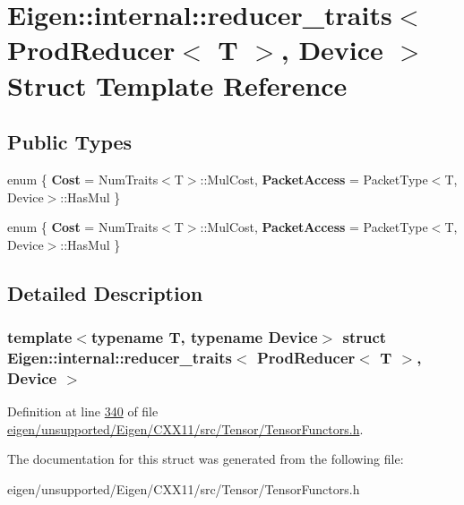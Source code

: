 \hypertarget{struct_eigen_1_1internal_1_1reducer__traits_3_01_prod_reducer_3_01_t_01_4_00_01_device_01_4}{}\section{Eigen\+:\+:internal\+:\+:reducer\+\_\+traits$<$ Prod\+Reducer$<$ T $>$, Device $>$ Struct Template Reference}
\label{struct_eigen_1_1internal_1_1reducer__traits_3_01_prod_reducer_3_01_t_01_4_00_01_device_01_4}
\subsection*{Public Types}
\begin{DoxyCompactItemize}
\item 
\mbox{\label{struct_eigen_1_1internal_1_1reducer__traits_3_01_prod_reducer_3_01_t_01_4_00_01_device_01_4_aee5e447fa255c076d8ab162254d69d8b}} 
enum \{ {\bfseries Cost} = Num\+Traits$<$T$>$\+:\+:Mul\+Cost, 
{\bfseries Packet\+Access} = Packet\+Type$<$T, Device$>$\+:\+:Has\+Mul
 \}
\item 
\mbox{\label{struct_eigen_1_1internal_1_1reducer__traits_3_01_prod_reducer_3_01_t_01_4_00_01_device_01_4_a773fd34dac3730ab17124f770431b870}} 
enum \{ {\bfseries Cost} = Num\+Traits$<$T$>$\+:\+:Mul\+Cost, 
{\bfseries Packet\+Access} = Packet\+Type$<$T, Device$>$\+:\+:Has\+Mul
 \}
\end{DoxyCompactItemize}


\subsection{Detailed Description}
\subsubsection*{template$<$typename T, typename Device$>$\newline
struct Eigen\+::internal\+::reducer\+\_\+traits$<$ Prod\+Reducer$<$ T $>$, Device $>$}



Definition at line \hyperlink{eigen_2unsupported_2_eigen_2_c_x_x11_2src_2_tensor_2_tensor_functors_8h_source_l00340}{340} of file \hyperlink{eigen_2unsupported_2_eigen_2_c_x_x11_2src_2_tensor_2_tensor_functors_8h_source}{eigen/unsupported/\+Eigen/\+C\+X\+X11/src/\+Tensor/\+Tensor\+Functors.\+h}.



The documentation for this struct was generated from the following file\+:\begin{DoxyCompactItemize}
\item 
eigen/unsupported/\+Eigen/\+C\+X\+X11/src/\+Tensor/\+Tensor\+Functors.\+h\end{DoxyCompactItemize}
